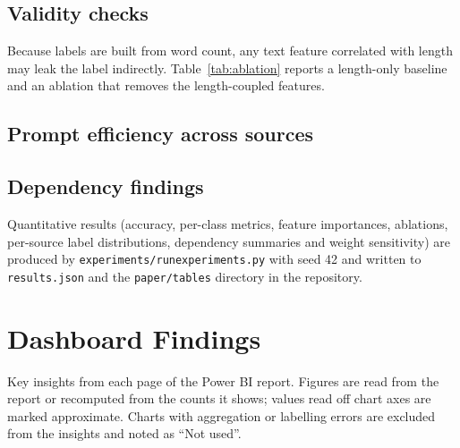 \documentclass[11pt,a4paper]{article}
\renewcommand{\_}{\textunderscore\hspace{0pt}}
\begin{document}
\subsection{Validity checks}
Because labels are built from word count, any text feature correlated with length may leak the label indirectly. Table~\ref{tab:ablation} reports a length-only baseline and an ablation that removes the length-coupled features.
\begin{table}[H]
\centering\small

\caption{Accuracy and macro-F1 under ablation. The length-only baseline uses word count alone.}
\label{tab:ablation}
\end{table}


\subsection{Prompt efficiency across sources}
\begin{table}[H]
\centering\small

\caption{Predicted label shares and mean model confidence by source.}
\end{table}


\subsection{Dependency findings}
\begin{table}[H]
\centering\small

\caption{Dependency score summary by population.}
\end{table}
\begin{table}[H]
\centering\small

\caption{Weight-sensitivity analysis: Spearman rank correlation between the baseline score and scores recomputed under random $\pm$ perturbations of the weights.}
\end{table}


\else
Quantitative results (accuracy, per-class metrics, feature importances, ablations, per-source label distributions, dependency summaries and weight sensitivity) are produced by \texttt{experiments/run\_experiments.py} with seed 42 and written to \texttt{results.json} and the \texttt{paper/tables} directory in the repository.
\fi


\section{Dashboard Findings}
Key insights from each page of the Power BI report. Figures are read from the report or recomputed from the counts it shows; values read off chart axes are marked approximate. Charts with aggregation or labelling errors are excluded from the insights and noted as ``Not used''.
\end{document}
